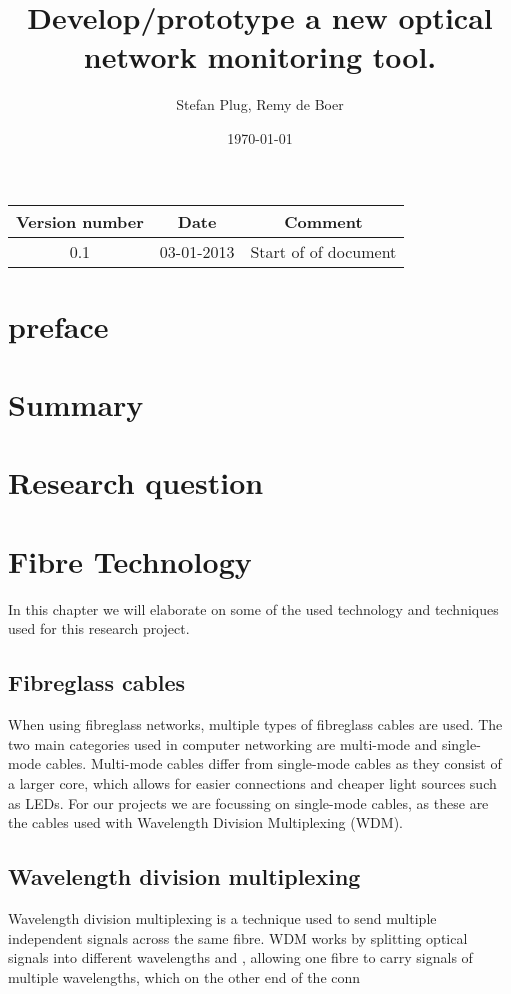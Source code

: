 \documentclass{article}
\begin{document}
\title{Develop/prototype a new optical network monitoring tool. }
\author{Stefan Plug, Remy de Boer}
\date{\today}
\maketitle

\begin{tabular}{|c|c|c|}
\hline 
Version number & Date & Comment \\ 
\hline 
0.1 & 03-01-2013 & Start of of document \\ 
\hline 
\end{tabular} 

\tableofcontents

\section{preface}

\section{Summary}

\section{Research question}

\section{Fibre Technology}
In this chapter we will elaborate on some of the used technology and techniques used for this research project.
\subsection{Fibreglass cables}
When using fibreglass networks, multiple types of fibreglass cables are used.
The two main categories used in computer networking are multi-mode and single-mode cables.
Multi-mode cables differ from single-mode cables as they consist of a larger core, which allows for easier connections and cheaper light sources such as LEDs. \cite{Fundamentals:2008}
For our projects we are focussing on single-mode cables, as these are the cables used with Wavelength Division Multiplexing (WDM).

\subsection{Wavelength division multiplexing}
Wavelength division multiplexing is a technique used to send multiple independent signals across the same fibre.  WDM works by splitting optical signals into different wavelengths and , allowing one fibre to carry signals of multiple wavelengths, which on the other end of the conn
\end{document}

